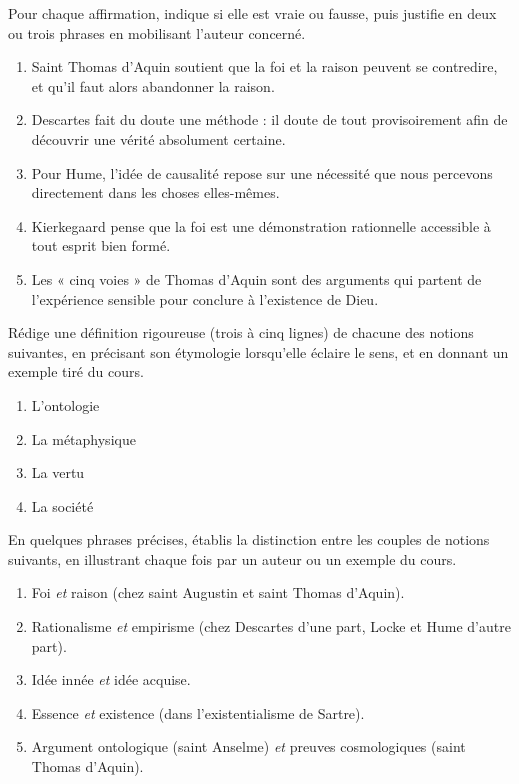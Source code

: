 \documentclass[11pt]{article}
\newcommand{\cle}[1]{{\popxbold\color{popdark}#1}}
\begin{document}
\begin{exercice}
Pour chaque affirmation, indique si elle est vraie ou fausse, puis justifie en deux ou trois phrases en mobilisant l'auteur concerné.

\begin{enumerate}
\item Saint Thomas d'Aquin soutient que la foi et la raison peuvent se contredire, et qu'il faut alors abandonner la raison.
\item Descartes fait du doute une méthode : il doute de tout provisoirement afin de découvrir une vérité absolument certaine.
\item Pour Hume, l'idée de causalité repose sur une nécessité que nous percevons directement dans les choses elles-mêmes.
\item Kierkegaard pense que la foi est une démonstration rationnelle accessible à tout esprit bien formé.
\item Les « cinq voies » de Thomas d'Aquin sont des arguments qui partent de l'expérience sensible pour conclure à l'existence de Dieu.
\end{enumerate}
\end{exercice}

\begin{exercice}
Rédige une définition rigoureuse (trois à cinq lignes) de chacune des notions suivantes, en précisant son étymologie lorsqu'elle éclaire le sens, et en donnant un exemple tiré du cours.

\begin{enumerate}
\item L'\cle{ontologie}
\item La \cle{métaphysique}
\item La \cle{vertu}
\item La \cle{société}
\end{enumerate}
\end{exercice}

\begin{exercice}
En quelques phrases précises, établis la distinction entre les couples de notions suivants, en illustrant chaque fois par un auteur ou un exemple du cours.

\begin{enumerate}
\item Foi \emph{et} raison (chez saint Augustin et saint Thomas d'Aquin).
\item Rationalisme \emph{et} empirisme (chez Descartes d'une part, Locke et Hume d'autre part).
\item Idée innée \emph{et} idée acquise.
\item Essence \emph{et} existence (dans l'existentialisme de Sartre).
\item Argument ontologique (saint Anselme) \emph{et} preuves cosmologiques (saint Thomas d'Aquin).
\end{enumerate}
\end{exercice}
\end{document}
